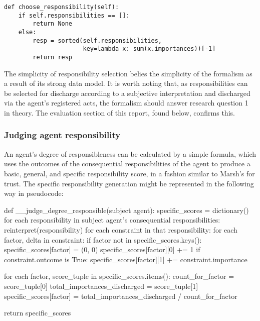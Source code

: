 \begin{lstlisting}
def choose_responsibility(self):
    if self.responsibilities == []:
        return None
    else:
        resp = sorted(self.responsibilities,
                      key=lambda x: sum(x.importances))[-1]
        return resp
\end{lstlisting}

The simplicity of responsibility selection belies the simplicity of the formalism as a result of its strong data model. It is worth noting that, as responsibilities can be selected for discharge according to a subjective interpretation and discharged via the agent's registered acts, the formalism should answer research question 1 in theory. The evaluation section of this report, found below, confirms this.\par

\subsubsection{Judging agent responsibility}  %
An agent's degree of responsibleness can be calculated by a simple formula, which uses the outcomes of the consequential responsibilities of the agent to produce a basic, general, and specific responsibility score, in a fashion similar to Marsh's for trust\cite{Marsh1994FormalisingConcept}. The specific responsibility generation might be represented in the following way in pseudocode:

\begin{pseudocodelisting}
def __judge_degree_responsible(subject agent):
    specific_scores = dictionary()
    for each responsibility in subject agent's consequential responsibilities:
        reinterpret(responsibility)
        for each constraint in that responsibility:
            for each factor, delta in constraint:
                if factor not in specific_scores.keys():
                    specific_scores[factor] = (0, 0)
                specific_scores[factor][0] += 1
                if constraint.outcome is True:
                    specific_scores[factor][1] += constraint.importance
                    
    for each factor, score_tuple in specific_scores.items():
        count_for_factor = score_tuple[0]
        total_importances_discharged = score_tuple[1]
        specific_scores[factor] = total_importances_discharged / count_for_factor
        
    return specific_scores
\end{pseudocodelisting} 

